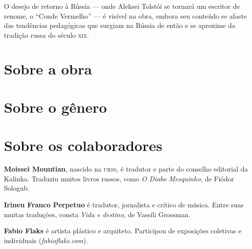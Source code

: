 O desejo de retorno à Rússia --- onde Aleksei Tolstói se tornará um
escritor de renome, o ``Conde Vermelho'' --- é visível na obra, embora
seu conteúdo se afaste das tendências pedagógicas que surgiam na Rússia
de então e se aproxime da tradição russa do século \textsc{xix}.


\section{Sobre a obra}\label{para2}

\lipsum[1]

\section{Sobre o gênero}\label{para3}

\lipsum[1]

\section{Sobre os colaboradores}\label{colab}

\noindent\textbf{Moissei Mountian}, nascido na \textsc{urss}, é tradutor e parte do
conselho editorial da Kalinka. Traduziu muitos livros russos, como
\emph{O Diabo Mesquinho}, de Fiódor Sologub.

\medskip

\noindent\textbf{Irineu Franco Perpetuo} é tradutor, jornalista e crítico de
música. Entre suas muitas traduções, consta \emph{Vida e destino}, de
Vassíli Grossman.

\medskip

\noindent\textbf{Fabio Flaks} é artista plástico e arquiteto. Participou de
exposições coletivas e individuais (\textit{fabioflaks.com}).


